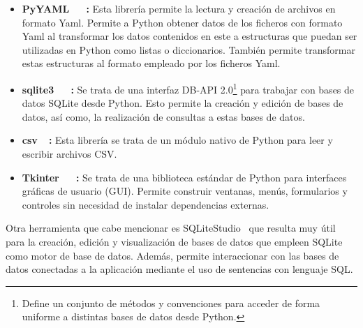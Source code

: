 \begin{itemize} 
    \item \textbf{PyYAML~\cite{PyYaml}~\cite{yaml_quick_start_2019}~\cite{wittmann_mastering_yaml_2023}:} Esta librería permite la lectura y creación de archivos en formato \acrshort{Yaml}. Permite a Python obtener datos de los ficheros con formato \acrshort{Yaml} al transformar los datos contenidos en este a estructuras que puedan ser utilizadas en Python como listas o diccionarios. También permite transformar estas estructuras al formato empleado por los ficheros \acrshort{Yaml}.
    
    \item \textbf{sqlite3~\cite{SQLite3}~\cite{Python_SQLite3}~\cite{learn_sqlite_python_2019}:} Se trata de una interfaz DB-API 2.0\footnote{Define un conjunto de métodos y convenciones para acceder de forma uniforme a distintas bases de datos desde Python.} para trabajar con bases de datos SQLite desde Python. Esto permite la creación y edición de bases de datos, así como, la realización de consultas a estas bases de datos.
    
    \item \textbf{csv~\cite{Python_CSV}~\cite{martelli_modern_python_cookbook_2019}:} Esta librería se trata de un módulo nativo de Python para leer y escribir archivos \acrshort{CSV}.

    \item \textbf{Tkinter~\cite{Tkinter}~\cite{Meier2017}~\cite{moore_tkinter_2021}:} Se trata de una biblioteca estándar de Python para interfaces gráficas de usuario (GUI). Permite construir ventanas, menús, formularios y controles sin necesidad de instalar dependencias externas.
\end{itemize}

Otra herramienta que cabe mencionar es SQLiteStudio~\cite{SQLiteStudio} que resulta muy útil para la creación, edición y visualización de bases de datos que empleen SQLite como motor de base de datos. Además, permite interaccionar con las bases de datos conectadas a la aplicación mediante el uso de sentencias con lenguaje \acrfull{SQL}. 